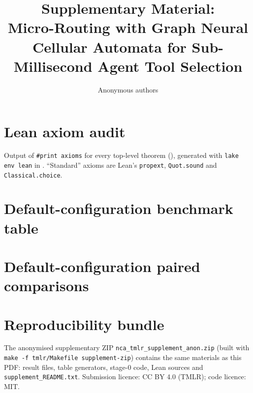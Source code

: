 \documentclass[10pt]{article}
\title{Supplementary Material:\\Micro-Routing with Graph Neural Cellular Automata for Sub-Millisecond Agent Tool Selection}
\author{Anonymous authors}
\begin{document}
\maketitle

\section{Lean axiom audit}\label{sup:lean}
Output of \texttt{\#print axioms} for every top-level theorem (), generated with \texttt{lake env lean} in . ``Standard'' axioms are Lean's \texttt{propext}, \texttt{Quot.sound} and \texttt{Classical.choice}.
{\scriptsize
}

\section{Default-configuration benchmark table}\label{sup:multibench}
\begin{table}[t]
\centering
\small
\caption{Test top-1 accuracy (\%, mean $\pm$ SD over seeds 0--2). Source S1.}
\label{tab:sup-multibench}

\end{table}

\section{Default-configuration paired comparisons}\label{sup:paired}
\begin{table}[t]
\centering
\scriptsize
\setlength{\tabcolsep}{2.5pt}
\caption{Paired comparisons, tree GNCA minus baseline (pp). Seed-clustered bootstrap over test turns. Source S1.}
\label{tab:sup-paired}

\end{table}

\section{Reproducibility bundle}
The anonymised supplementary ZIP \texttt{nca\_tmlr\_supplement\_anon.zip} (built with \texttt{make -f tmlr/Makefile supplement-zip}) contains the same materials as this PDF: result files, table generators, stage-0 code, Lean sources and \texttt{supplement\_README.txt}. Submission licence: CC BY 4.0 (TMLR); code licence: MIT.
\end{document}
